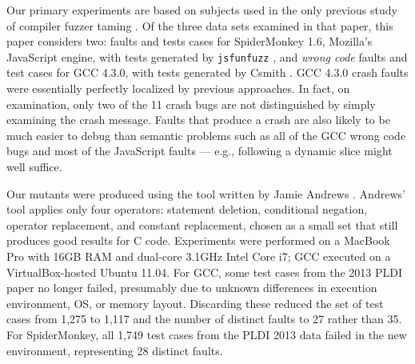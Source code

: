 



Our primary experiments are based on subjects used in the only previous study of compiler fuzzer taming \cite{PLDI13}.  Of the three data sets examined in that paper, this paper considers two:  faults and tests cases for SpiderMonkey 1.6, Mozilla's JavaScript engine, with tests generated by {\tt jsfunfuzz} \cite{jsfunfuzz}, and \emph{wrong code} faults and test cases for GCC 4.3.0, with tests generated by Csmith \cite{csmith}.  GCC 4.3.0 crash faults were essentially perfectly localized by previous approaches.  In fact, on examination, only two of the 11 crash bugs are not distinguished by simply examining the crash message.  Faults that produce a crash are also likely to be much easier to debug than semantic problems such as all of the GCC wrong code bugs and most of the JavaScript faults --- e.g., following a dynamic slice might well suffice.


Our mutants were produced using the tool written by Jamie Andrews \cite{mutant}.  Andrews' tool applies only four operators: statement deletion, conditional negation, operator replacement, and constant replacement, chosen as a small set that still produces good results for C code.  Experiments were performed on a MacBook Pro with 16GB RAM and dual-core 3.1GHz Intel Core i7; GCC executed on a VirtualBox-hosted Ubuntu 11.04.  For GCC, some test cases from the 2013 PLDI paper no longer failed, presumably due to unknown differences in execution environment, OS, or memory layout. Discarding these reduced the set of test cases from 1,275 to 1,117 and the number of distinct faults to 27 rather than 35.  For SpiderMonkey, all 1,749 test cases from the PLDI 2013 data failed in the new environment, representing 28 distinct faults.

